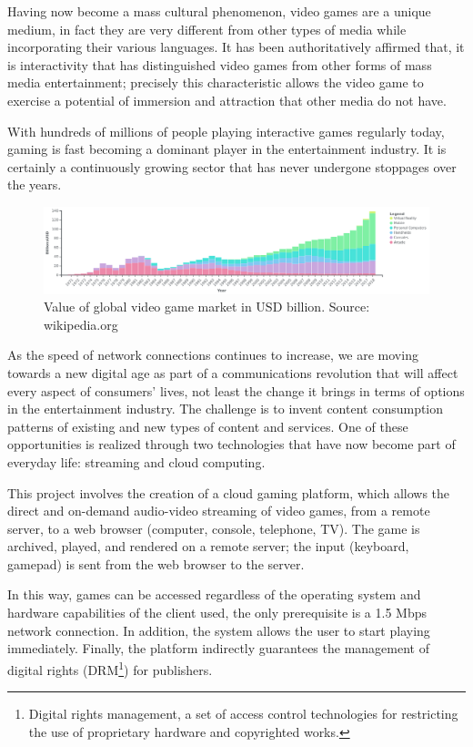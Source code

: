 Having now become a mass cultural phenomenon, video games are a unique medium, in fact they are very different from other types of media while incorporating their various languages. It has been authoritatively affirmed that, it is interactivity that has distinguished video games from other forms of mass media entertainment; precisely this characteristic allows the video game to exercise a potential of immersion and attraction that other media do not have.

With hundreds of millions of people playing interactive games regularly today, gaming is fast becoming a dominant player in the entertainment industry.	It is certainly a continuously growing sector that has never undergone stoppages over the years.

\begin{figure}[H]
	\includegraphics[width=\linewidth]{immagini/valore_commerciale_giochi_globale.png}
	\caption{Value of global video game market in USD billion. Source: wikipedia.org}
	\label{fig:valore_commerciale_giochi_globale}
\end{figure}

As the speed of network connections continues to increase, we are moving towards a new digital age as part of a communications revolution that will affect every aspect of consumers' lives, not least the change it brings in terms of options in the entertainment industry. The challenge is to invent content consumption patterns of existing and new types of content and services. One of these opportunities is realized through two technologies that have now become part of everyday life: streaming and cloud computing.

This project involves the creation of a cloud gaming platform, which allows the direct and on-demand audio-video streaming of video games, from a remote server, to a web browser (computer, console, telephone, TV). The game is archived, played, and rendered on a remote server; the input (keyboard, gamepad) is sent from the web browser to the server.

In this way, games can be accessed regardless of the operating system and hardware capabilities of the client used, the only prerequisite is a 1.5 Mbps network connection. In addition, the system allows the user to start playing immediately. Finally, the platform indirectly guarantees the management of digital rights (DRM\footnote{Digital rights management, a set of access control technologies for restricting the use of proprietary hardware and copyrighted works.}) for publishers.

